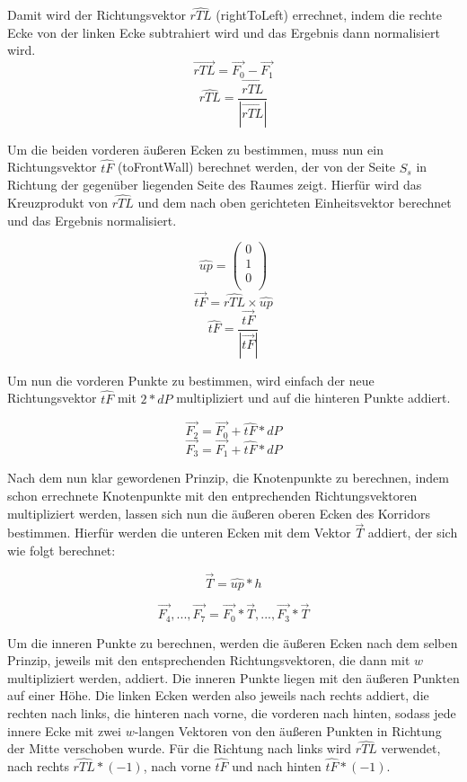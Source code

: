 Damit wird der Richtungsvektor $\hat{rTL}$ (rightToLeft) errechnet, indem die rechte Ecke von der linken Ecke subtrahiert wird und das Ergebnis dann normalisiert wird.
$$ \vec{rTL} = \vec{F_0} - \vec{F_1} $$
$$ \hat{rTL}=\frac{\vec{rTL}}{\left | \vec{rTL} \right |} $$

Um die beiden vorderen äußeren Ecken zu bestimmen, muss nun ein Richtungsvektor $\hat{tF}$ (toFrontWall) berechnet werden, der von der Seite $S_s$ in Richtung der gegenüber liegenden Seite des Raumes zeigt. Hierfür wird das Kreuzprodukt von $\hat{rTL}$ und dem nach oben gerichteten Einheitsvektor berechnet und das Ergebnis normalisiert.

$$ \hat{up} = \begin{pmatrix} 0 \\ 1 \\ 0 \\ \end{pmatrix} $$
$$ \vec{tF} = \hat{rTL} \times \hat{up} $$
$$ \hat{tF} = \frac{\vec{tF}}{\left | \vec{tF} \right |} $$

Um nun die vorderen Punkte zu bestimmen, wird einfach der neue Richtungsvektor $\hat{tF}$ mit $2 * dP$ multipliziert und auf die hinteren Punkte addiert.

$$ \vec{F_2} = \vec{F_0} + \hat{tF} * dP $$
$$ \vec{F_3} = \vec{F_1} + \hat{tF} * dP $$

Nach dem nun klar gewordenen Prinzip, die Knotenpunkte zu berechnen, indem schon errechnete Knotenpunkte mit den entprechenden Richtungsvektoren multipliziert werden, lassen sich nun die äußeren oberen Ecken des Korridors bestimmen. Hierfür werden die unteren Ecken mit dem Vektor $\vec{T}$ addiert, der sich wie folgt berechnet:

$$\vec{T} = \hat{up} * h $$

$$ \vec{F_4}, ..., \vec{F_7} = \vec{F_0} * \vec{T}, ..., \vec{F_3} * \vec{T} $$

Um die inneren Punkte zu berechnen, werden die äußeren Ecken nach dem selben Prinzip, jeweils mit den entsprechenden Richtungsvektoren, die dann mit $w$ multipliziert werden, addiert. Die inneren Punkte liegen mit den äußeren Punkten auf einer Höhe. Die linken Ecken werden also jeweils nach rechts addiert, die rechten nach links, die hinteren nach vorne, die vorderen nach hinten, sodass jede innere Ecke mit zwei $w$-langen Vektoren von den äußeren Punkten in Richtung der Mitte verschoben wurde. Für die Richtung nach links wird $\hat{rTL}$ verwendet, nach rechts $\hat{rTL} * (-1)$, nach vorne $\hat{tF}$ und nach hinten $\hat{tF} * (-1)$.

